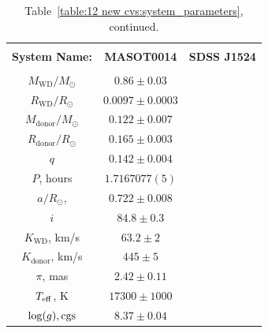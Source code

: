 \begin{landscape}
    \begin{table}
        \centering
        \caption{Table~\ref{table:12 new cvs:system_parameters}, continued.}
        \label{table:12 new cvs:system_parameters cont 2}
        \begin{tabular}{ccc}
            \hline \\
            \textbf{System Name:}      & \textbf{MASOT0014}     & \textbf{SDSS J1524} \\
            \hline \hline \\
            $M_\mathrm{WD}/M_\odot$    & $0.86\pm0.03$          & $ $ \\
            $R_\mathrm{WD}/R_\odot$    & $0.0097\pm0.0003$      & $ $ \\
            $M_\mathrm{donor}/M_\odot$ & $0.122\pm0.007$        & $ $ \\
            $R_\mathrm{donor}/R_\odot$ & $0.165\pm0.003$        & $ $ \\
            $q$                        & $0.142\pm0.004$        & $ $ \\
            \hline
            $P$, hours                 & $1.7167077(5)$         & $ $ \\
            $a/R_\odot$,               & $0.722\pm0.008$        & $ $ \\
            $i$                        & $84.8\pm0.3$           & $ $ \\
            $K_\mathrm{WD}$, km/s      & $63.2\pm2$             & $ $ \\
            $K_\mathrm{donor}$, km/s   & $445\pm5$              & $ $ \\
            \hline
            $\pi$, mas                 & $2.42\pm0.11$          & $ $ \\
            $T_{\rm eff}$, K           & $17300\pm1000$         & $ $ \\
            $\log(g), {\rm cgs}$       & $8.37\pm0.04$          & $ $ \\
            \hline
            \hline
        \end{tabular}
    \end{table}
\end{landscape}

